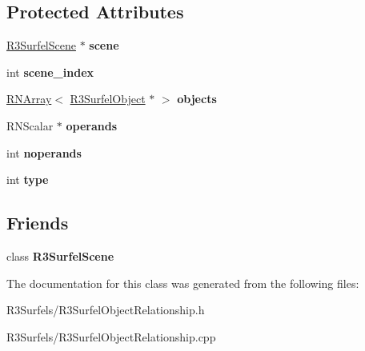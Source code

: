 \subsection*{Protected Attributes}
\begin{DoxyCompactItemize}
\item 
\hyperlink{class_r3_surfel_scene}{R3\+Surfel\+Scene} $\ast$ {\bfseries scene}\hypertarget{class_r3_surfel_object_relationship_a41243390750e832ae9704d127a67cf12}{}\label{class_r3_surfel_object_relationship_a41243390750e832ae9704d127a67cf12}

\item 
int {\bfseries scene\+\_\+index}\hypertarget{class_r3_surfel_object_relationship_afdab131a845e65a4ffadc164a72a0ba6}{}\label{class_r3_surfel_object_relationship_afdab131a845e65a4ffadc164a72a0ba6}

\item 
\hyperlink{class_r_n_array}{R\+N\+Array}$<$ \hyperlink{class_r3_surfel_object}{R3\+Surfel\+Object} $\ast$ $>$ {\bfseries objects}\hypertarget{class_r3_surfel_object_relationship_a6d0b4c3be6ebea54519c27e6fe82e5a7}{}\label{class_r3_surfel_object_relationship_a6d0b4c3be6ebea54519c27e6fe82e5a7}

\item 
R\+N\+Scalar $\ast$ {\bfseries operands}\hypertarget{class_r3_surfel_object_relationship_a8f2d7d83e51b410ab6cecb2cdf5b9ada}{}\label{class_r3_surfel_object_relationship_a8f2d7d83e51b410ab6cecb2cdf5b9ada}

\item 
int {\bfseries noperands}\hypertarget{class_r3_surfel_object_relationship_acf4f643711969fe557f8989f892b9391}{}\label{class_r3_surfel_object_relationship_acf4f643711969fe557f8989f892b9391}

\item 
int {\bfseries type}\hypertarget{class_r3_surfel_object_relationship_a1ce0179d6b91874b599349a20dbdf3c6}{}\label{class_r3_surfel_object_relationship_a1ce0179d6b91874b599349a20dbdf3c6}

\end{DoxyCompactItemize}
\subsection*{Friends}
\begin{DoxyCompactItemize}
\item 
class {\bfseries R3\+Surfel\+Scene}\hypertarget{class_r3_surfel_object_relationship_af9bb32c0eac7d1d54787bbc6b44586b6}{}\label{class_r3_surfel_object_relationship_af9bb32c0eac7d1d54787bbc6b44586b6}

\end{DoxyCompactItemize}


The documentation for this class was generated from the following files\+:\begin{DoxyCompactItemize}
\item 
R3\+Surfels/R3\+Surfel\+Object\+Relationship.\+h\item 
R3\+Surfels/R3\+Surfel\+Object\+Relationship.\+cpp\end{DoxyCompactItemize}
